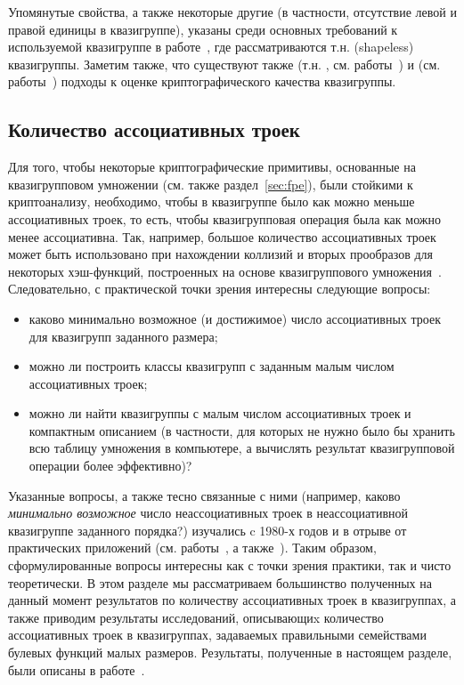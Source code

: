     Упомянутые свойства, а также некоторые другие (в частности, отсутствие левой и правой единицы в квазигруппе), указаны среди основных требований к используемой квазигруппе в работе~\cite{EdonR}, где рассматриваются т.н.  (shapeless) квазигруппы.
    Заметим также, что существуют также  (т.н. , см. работы~\cite{dimitrova2007classification, falcon2019computational}) и  (см. работы~\cite{markovski2005classification, bakeva2011some, ochodkova2009testing, dvorsky2009large}) подходы к оценке криптографического качества квазигруппы.
    

\subsection{Количество ассоциативных троек}
\label{subsec:assoc_problem}
    Для того, чтобы некоторые криптографические примитивы, основанные на квазигрупповом умножении (см. также раздел~\ref{sec:fpe}), были стойкими к криптоанализу, необходимо, чтобы в квазигруппе было как можно меньше ассоциативных троек, то есть, чтобы квазигрупповая операция была как можно менее ассоциативна.
    Так, например, большое количество ассоциативных троек может быть использовано при нахождении коллизий и вторых прообразов для некоторых хэш-функций, построенных на основе квазигруппового умножения~\cite{valent16}.
    Следовательно, с практической точки зрения интересны следующие вопросы:
    \begin{itemize}
        \item каково минимально возможное (и достижимое) число ассоциативных троек для квазигрупп заданного размера;
        \item можно ли построить классы квазигрупп с заданным малым числом ассоциативных троек;
        \item можно ли найти квазигруппы с малым числом ассоциативных троек и компактным описанием (в частности, для которых не нужно было бы хранить всю таблицу умножения в компьютере, а вычислять результат квазигрупповой операции более эффективно)?
    \end{itemize}

    Указанные вопросы, а также тесно связанные с ними (например, каково \textit{минимально возможное} число неассоциативных троек в неассоциативной квазигруппе заданного порядка?) изучались c 1980-х годов и в отрыве от практических приложений (см. работы~\cite{kepka1980note, kepka1981notes, drapal1981note, kotzig83, drapal1983quasigroups}, а также~\cite[задача~1.1]{keedwell}).
    Таким образом, сформулированные вопросы интересны как с точки зрения практики, так и чисто теоретически.
    В этом разделе мы рассматриваем большинство полученных на данный момент результатов по количеству ассоциативных троек в квазигруппах, а также приводим результаты исследований, описывающиx количество ассоциативных троек в квазигруппах, задаваемых правильными семействами булевых функций малых размеров.
    Результаты, полученные в настоящем разделе, были описаны в работе~\cite{tsar24}.


